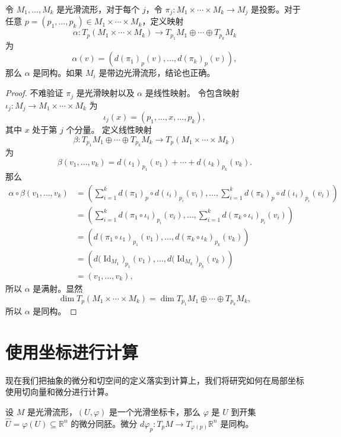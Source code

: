 \documentclass[fontset=none]{Notes}
\DeclareMathOperator\Id{Id}
\begin{document}
\begin{proposition}[积流形的切空间]
  令 $M_1,\dots,M_k$ 是光滑流形，对于每个 $j$，令 $\pi_j:M_1\times\cdots\times M_k\to M_j$
  是投影。对于任意 $p=(p_1,\dots,p_k)\in M_1\times\cdots\times M_k$，定义映射
  \[
    \alpha:T_p(M_1\times\cdots\times M_k)\to T_{p_1}M_1\oplus \cdots\oplus T_{p_k}M_k  
  \]
  为
  \[
    \alpha(v)=\left(d(\pi_1)_p(v),\dots,d(\pi_k)_p(v)\right),  
  \]
  那么 $\alpha$ 是同构。如果 $M_i$ 是带边光滑流形，结论也正确。
\end{proposition}
\begin{proof}
  不难验证 $\pi_j$ 是光滑映射以及 $\alpha$ 是线性映射。
  令包含映射 $\iota_j:M_j\to M_1\times\cdots\times M_k$ 为
  \[
    \iota_j(x)=(p_1,\dots,x,\dots,p_k),  
  \]
  其中 $x$ 处于第 $j$ 个分量。
  定义线性映射
  \[
    \beta:T_{p_1}M_1\oplus \cdots\oplus T_{p_k}M_k\to T_p(M_1\times\cdots\times M_k)
  \]
  为
  \[
    \beta(v_1,\dots,v_k)=d(\iota_1)_{p_1}(v_1)+\cdots+d(\iota_k)_{p_k}(v_k).
  \]
  那么
  \begin{align*}
    \alpha\circ\beta(v_1,\dots,v_k)&=\left(
      \sum_{i=1}^k d(\pi_1)_p\circ d(\iota_i)_{p_i}(v_i),\dots,
      \sum_{i=1}^k d(\pi_k)_p\circ d(\iota_i)_{p_i}(v_i)
    \right)  \\
    &=\left(\sum_{i=1}^kd(\pi_1\circ\iota_i)_{p_i}(v_i),\dots,\sum_{i=1}^kd(\pi_k\circ\iota_i)_{p_i}(v_i)\right)\\
    &=\left(
      d(\pi_1\circ\iota_1)_{p_1}(v_1),\dots,d(\pi_k\circ\iota_k)_{p_k}(v_k)
    \right)\\
    &=\left(
      d\bigl(\Id_{M_1}\bigr)_{p_1}(v_1),\dots,d\bigl(\Id_{M_k}\bigr)_{p_k}(v_k)
    \right)\\
    &=(v_1,\dots,v_k),
  \end{align*}
  所以 $\alpha$ 是满射。显然
  \[
    \dim   T_p(M_1\times\cdots\times M_k)=\dim T_{p_1}M_1\oplus \cdots\oplus T_{p_k}M_k  ,
  \]
  所以 $\alpha$ 是同构。
\end{proof}

\section{使用坐标进行计算}


现在我们把抽象的微分和切空间的定义落实到计算上，我们将研究如何在局部坐标
使用切向量和微分进行计算。

设 $M$ 是光滑流形，$(U,\varphi)$ 是一个光滑坐标卡，那么 $\varphi$
是 $U$ 到开集 $\hat U=\varphi(U)\subseteq\mathbb{R}^n$ 的微分同胚。微分
$d\varphi_p:T_pM\to T_{\varphi(p)}\mathbb{R}^n$ 是同构。
\end{document}
